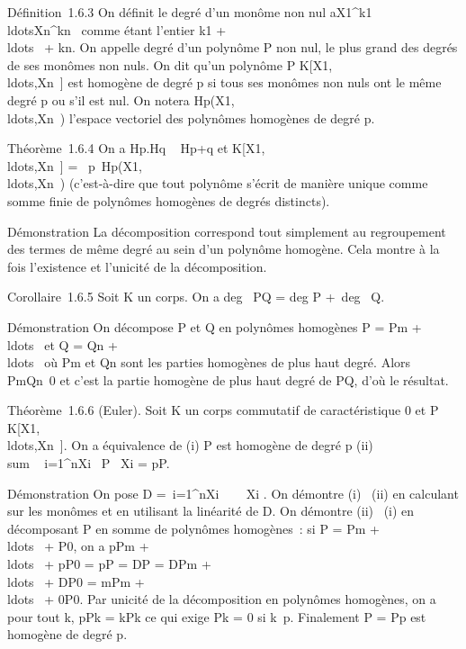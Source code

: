 Définition~1.6.3 On définit le degré d'un monôme non nul
aX1^k1\\ldotsXn^kn~
comme étant l'entier k1 +
\\ldots~ +
kn. On appelle degré d'un polynôme P non nul, le plus grand
des degrés de ses monômes non nuls. On dit qu'un polynôme P \in
K{[}X1,\\ldots,Xn~{]}
est homogène de degré p si tous ses monômes non nuls ont le même degré p
ou s'il est nul. On notera
Hp(X1,\\ldots,Xn~)
l'espace vectoriel des polynômes homogènes de degré p.

Théorème~1.6.4 On a Hp.Hq \subset~ Hp+q et
K{[}X1,\\ldots,Xn~{]}
=
\oplus~p\in{}~Hp(X1,\\ldots,Xn~)
(c'est-à-dire que tout polynôme s'écrit de manière unique comme somme
finie de polynômes homogènes de degrés distincts).

Démonstration La décomposition correspond tout simplement au
regroupement des termes de même degré au sein d'un polynôme homogène.
Cela montre à la fois l'existence et l'unicité de la décomposition.

Corollaire~1.6.5 Soit K un corps. On a deg~ PQ
= deg P +\ deg~ Q.

Démonstration On décompose P et Q en polynômes homogènes P =
Pm +
\\ldots~ et Q =
Qn +
\\ldots~ où
Pm et Qn sont les parties homogènes de plus haut
degré. Alors PmQn\neq~0 et
c'est la partie homogène de plus haut degré de PQ, d'où le résultat.

Théorème~1.6.6 (Euler). Soit K un corps commutatif de caractéristique 0
et P \in
K{[}X1,\\ldots,Xn~{]}.
On a équivalence de (i) P est homogène de degré p (ii)
\\sum ~
i=1^nXi \partial~P \over
\partial~Xi = pP.

Démonstration On pose D =\
\sum  i=1^nXi~ \partial~
\over \partial~Xi . On démontre (i) \rigtharrow~(ii) en
calculant sur les monômes et en utilisant la linéarité de D. On démontre
(ii) \rigtharrow~(i) en décomposant P en somme de polynômes homogènes~: si P =
Pm +
\\ldots~ +
P0, on a pPm +
\\ldots~ +
pP0 = pP = DP = DPm +
\\ldots~ +
DP0 = mPm +
\\ldots~ +
0P0. Par unicité de la décomposition en polynômes homogènes,
on a pour tout k, pPk = kPk ce qui exige
Pk = 0 si k\neq~p. Finalement P =
Pp est homogène de degré p.

